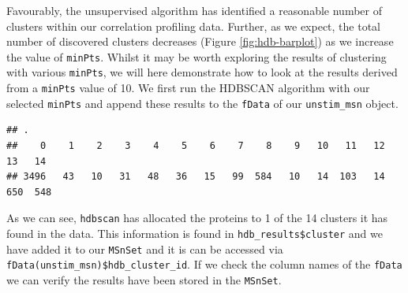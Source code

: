 \documentclass[9pt,a4paper,]{extarticle}
\newenvironment{Shaded}{\begin{snugshade}}{\end{snugshade}}
\newcommand{\AttributeTok}[1]{\textcolor[rgb]{0.13,0.29,0.53}{#1}}
\newcommand{\DecValTok}[1]{\textcolor[rgb]{0.00,0.00,0.81}{#1}}
\newcommand{\DocumentationTok}[1]{\textcolor[rgb]{0.56,0.35,0.01}{\textbf{\textit{#1}}}}
\newcommand{\FunctionTok}[1]{\textcolor[rgb]{0.13,0.29,0.53}{\textbf{#1}}}
\newcommand{\NormalTok}[1]{#1}
\newcommand{\OtherTok}[1]{\textcolor[rgb]{0.56,0.35,0.01}{#1}}
\newcommand{\SpecialCharTok}[1]{\textcolor[rgb]{0.81,0.36,0.00}{\textbf{#1}}}
\begin{document}
Favourably, the unsupervised algorithm has identified a reasonable number of
clusters within our correlation profiling data. Further, as we expect, the total
number of discovered clusters decreases (Figure \ref{fig:hdb-barplot}) as we
increase the value of \texttt{minPts}. Whilst it may be worth exploring the results of
clustering with various \texttt{minPts}, we will here demonstrate how to look at the
results derived from a \texttt{minPts} value of 10. We first run the HDBSCAN algorithm
with our selected \texttt{minPts} and append these results to the \texttt{fData} of our
\texttt{unstim\_msn} object.

\begin{Shaded}
\end{Shaded}

\begin{verbatim}
## .
##    0    1    2    3    4    5    6    7    8    9   10   11   12   13   14 
## 3496   43   10   31   48   36   15   99  584   10   14  103   14  650  548
\end{verbatim}

As we can see, \texttt{hdbscan} has allocated the proteins to 1 of the
14 clusters it has found in the data. This information is found in
\texttt{hdb\_results\$cluster} and we have added it to our \texttt{MSnSet} and it is can be
accessed via \texttt{fData(unstim\_msn)\$hdb\_cluster\_id}. If we check the column names
of the \texttt{fData} we can verify the results have been stored in the \texttt{MSnSet}.
\end{document}

